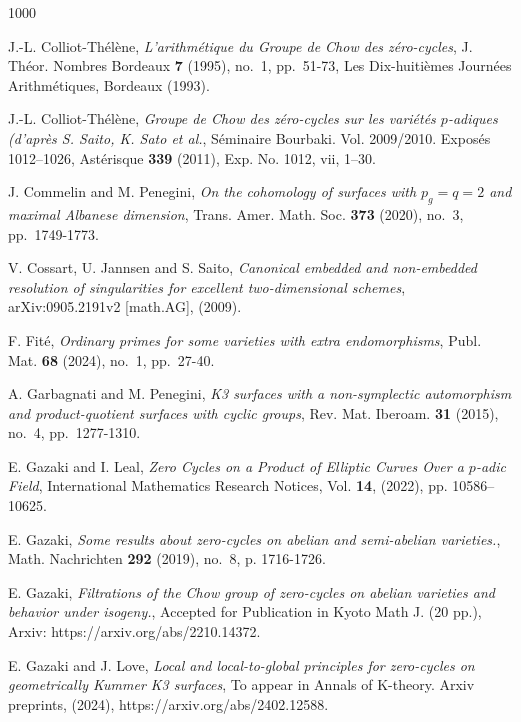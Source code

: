 \documentclass[12pt]{amsart}
\theoremstyle{remark}
\renewcommand{\1}{{\mathbb{S}}}
\newcommand{\<}{\langle}
\renewcommand{\>}{\rangle}
\begin{document}
\begin{thebibliography}{1000}
    
	 J.-L. Colliot-Th\'{e}l\`{e}ne, \textit{L'arithm\'{e}tique du Groupe de Chow des z\'{e}ro-cycles}, J. Th\'{e}or. Nombres Bordeaux \textbf{7} (1995), no.~1, pp.~51-73, Les Dix-huiti\`{e}mes Journ\'{e}es Arithm\'{e}tiques, Bordeaux (1993). \ 

     J.-L. Colliot-Th\'{e}l\`{e}ne, \textit{Groupe de Chow des z\'{e}ro-cycles sur les vari\'{e}t\'{e}s $p$-adiques (d'apr\`{e}s S. Saito, K. Sato et al.}, S\'{e}minaire Bourbaki. Vol. 2009/2010. Expos\'{e}s 1012–1026, Ast\'{e}risque \textbf{339} (2011), Exp. No. 1012, vii, 1–30. \  


     J. Commelin and M. Penegini, \textit{On the cohomology of surfaces with $p_g = q = 2$ and maximal
              Albanese dimension}, Trans. Amer. Math. Soc. \textbf{373} (2020), no.~3, pp.~1749-1773. \ 


  V. Cossart, U. Jannsen and S. Saito, \textit{Canonical embedded and non-embedded resolution of singularities
for excellent two-dimensional schemes}, arXiv:0905.2191v2 [math.AG], (2009). \ 



 F. Fit\'{e}, \textit{Ordinary primes for some varieties with extra endomorphisms}, Publ. Mat. \textbf{68} (2024), no.~1, pp.~27-40. \ 
    

     A. Garbagnati and M. Penegini, \textit{K3 surfaces with a non-symplectic automorphism and
              product-quotient surfaces with cyclic groups}, Rev. Mat. Iberoam. \textbf{31} (2015), no.~4, pp.~1277-1310. \ 
		
		 E. Gazaki and I. Leal, {\sl Zero Cycles on a Product of Elliptic Curves Over a $p$-adic Field}, International Mathematics Research Notices, Vol. {\bf 14}, (2022), pp. 10586–10625. 
        
         E. Gazaki, {\sl Some results about zero-cycles on abelian and semi-abelian varieties.}, Math. Nachrichten \textbf{292} (2019), no.~8, p. 1716-1726.\
		
		 E. Gazaki, {\sl Filtrations of the Chow group of zero-cycles on abelian varieties and behavior under isogeny.}, Accepted for Publication in Kyoto Math J. (20 pp.), Arxiv: https://arxiv.org/abs/2210.14372.
		
		 E. Gazaki and J. Love, {\sl  Local and local-to-global principles for zero-cycles on geometrically Kummer K3 surfaces}, To appear in Annals of K-theory. Arxiv preprints, (2024), https://arxiv.org/abs/2402.12588.


\end{thebibliography}
\end{document}
